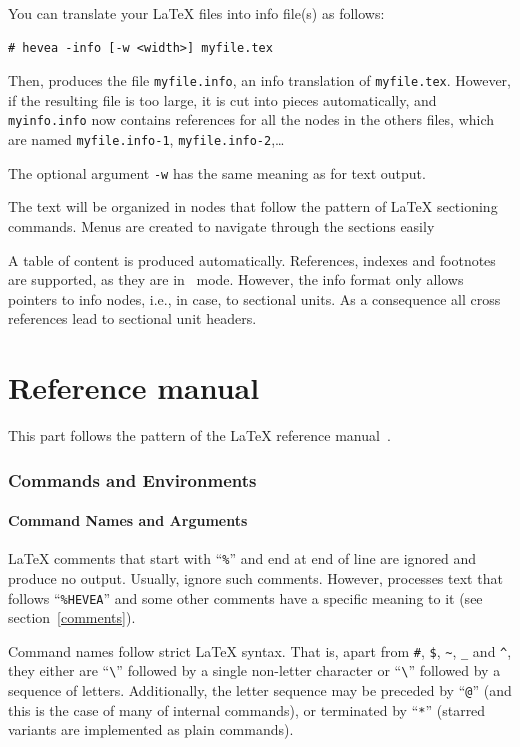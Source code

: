 You can translate your \LaTeX{} files into info file(s) as follows:
\begin{verbatim}
# hevea -info [-w <width>] myfile.tex
\end{verbatim}
Then, \hevea{} produces the file \texttt{myfile.info}, an info
translation of \texttt{myfile.tex}.
However, if the resulting  file is too large, it is cut into pieces
automatically,
and \texttt{myinfo.info} now contains references for all
the nodes in the others files, which are named \texttt{myfile.info-1},
\texttt{myfile.info-2},\ldots

The optional argument \verb+-w+ has the same meaning as for text output.

The text will be organized in nodes that follow
the pattern of \LaTeX{} sectioning
commands. Menus are created to navigate through the sections easily

A table of content is produced automatically.
References, indexes and footnotes are supported, as they are in
\html{}~mode.
However, the info format only allows pointers to info nodes,
i.e., in \hevea{} case, to sectional units.
As a consequence all cross references lead to sectional unit headers.


\setcounter{section}{0}
\renewcommand{\thesection}{\thepart.\arabic{section}}
\cutend

\part{Reference manual}
\label{referencemanual}
This part follows the pattern of the \LaTeX{} reference
manual~\cite[Appendix~C]{latex}.

\section{Commands and Environments}

\subsection{Command Names and Arguments}

\LaTeX{} comments that start with ``\verb+%+'' %
and end at end of line are ignored and produce no output.
Usually, \hevea{} ignore such comments. However, \hevea{} processes
text that follows ``\verb+%HEVEA+'' %
and some other comments have a specific meaning to it (see
section~\ref{comments}).

Command names follow strict \LaTeX{} syntax. That is, apart from
\verb+#+, \verb+$+, %
\verb+~+, \verb+_+ and \verb+^+, they either are
``\verb+\+'' followed by a single non-letter character or
``\verb+\+'' followed by a sequence of letters.
Additionally, the letter sequence may be preceded by ``\verb+@+''
(and this is the case of many of \hevea{} internal commands), or
terminated by ``\verb+*+'' (starred variants are implemented as plain
commands).

